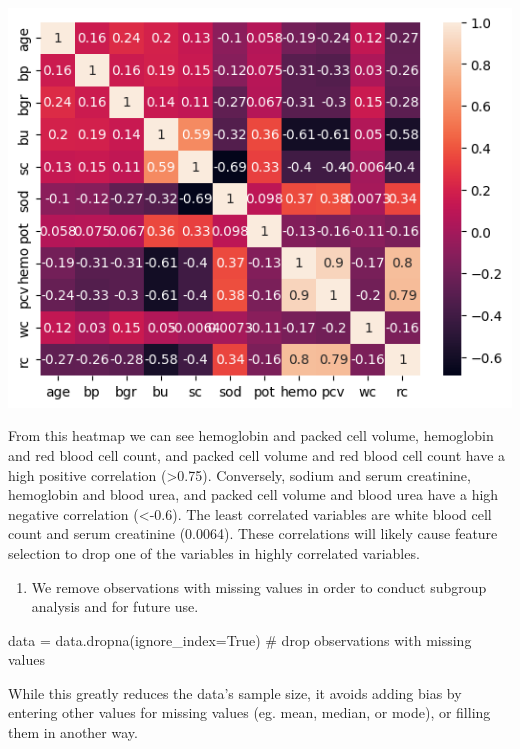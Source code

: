 \documentclass[
  11pt,
  letterpaper,
  DIV=11,
  numbers=noendperiod]{scrartcl}
\newenvironment{Shaded}{\begin{snugshade}}{\end{snugshade}}
\newcommand{\CommentTok}[1]{\textcolor[rgb]{0.37,0.37,0.37}{#1}}
\newcommand{\NormalTok}[1]{\textcolor[rgb]{0.00,0.23,0.31}{#1}}
\newcommand{\OperatorTok}[1]{\textcolor[rgb]{0.37,0.37,0.37}{#1}}
\newcommand{\VariableTok}[1]{\textcolor[rgb]{0.07,0.07,0.07}{#1}}
\providecommand{\tightlist}{%
  \setlength{\itemsep}{0pt}\setlength{\parskip}{0pt}}\usepackage{longtable,booktabs,array}
\begin{document}
\includegraphics{Seebach_Lily_HW6_files/figure-pdf/cell-12-output-1.png}

From this heatmap we can see hemoglobin and packed cell volume,
hemoglobin and red blood cell count, and packed cell volume and red
blood cell count have a high positive correlation (\textgreater0.75).
Conversely, sodium and serum creatinine, hemoglobin and blood urea, and
packed cell volume and blood urea have a high negative correlation
(\textless-0.6). The least correlated variables are white blood cell
count and serum creatinine (0.0064). These correlations will likely
cause feature selection to drop one of the variables in highly
correlated variables.

\begin{enumerate}
\def\labelenumi{\arabic{enumi}.}
\setcounter{enumi}{4}
\tightlist
\item
  We remove observations with missing values in order to conduct
  subgroup analysis and for future use.
\end{enumerate}

\begin{Shaded}
\begin{Highlighting}[]
\NormalTok{data }\OperatorTok{=}\NormalTok{ data.dropna(ignore\_index}\OperatorTok{=}\VariableTok{True}\NormalTok{) }\CommentTok{\# drop observations with missing values}
\end{Highlighting}
\end{Shaded}

While this greatly reduces the data's sample size, it avoids adding bias
by entering other values for missing values (eg. mean, median, or mode),
or filling them in another way.
\end{document}
